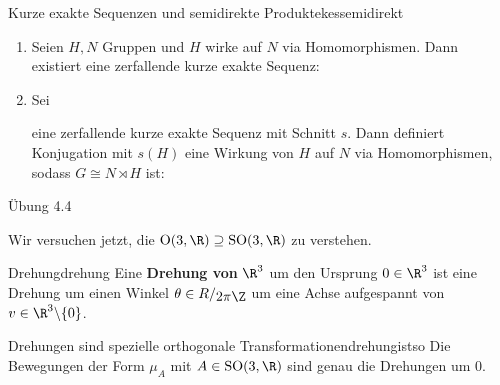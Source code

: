 \begin{satz}{Kurze exakte Sequenzen und semidirekte Produkte}{kessemidirekt}
\begin{enumerate}
\item Seien $H,N$ Gruppen und $H$ wirke auf $N$ via Homomorphismen. Dann existiert eine zerfallende kurze exakte Sequenz:
\begin{center}
\end{center}
\item Sei 
\begin{center}
\end{center}
eine zerfallende kurze exakte Sequenz mit Schnitt $s$. Dann definiert Konjugation mit $s(H)$ eine Wirkung von $H$ auf $N$ via Homomorphismen, sodass $G \cong N \rtimes H$ ist:
\begin{center}
\end{center}
\end{enumerate}
\end{satz}
\begin{beweis}
Übung 4.4
\end{beweis}
Wir versuchen jetzt, die $\text{O}(3,\R) \supseteq \text{SO}(3, \R)$ zu verstehen.
\begin{definition}{Drehung}{drehung}
Eine \textbf{Drehung von} $\R^3$ um den Ursprung $0 \in \R^3$ ist eine Drehung um einen Winkel $\theta \in \quotient{R}{2 \pi \Z}$ um eine Achse aufgespannt von $v \in \R^3 \exc \{0\}$.
\end{definition}
\begin{satz}{Drehungen sind spezielle orthogonale Transformationen}{drehungistso}
Die Bewegungen der Form $\mu_A$ mit $A \in \text{SO}(3,\R)$ sind genau die Drehungen um $0$.
\end{satz}
